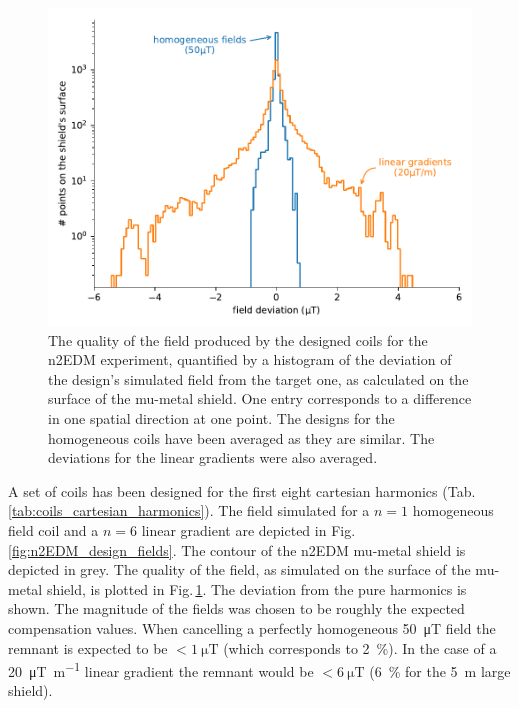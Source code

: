 \begin{figure}
  \centering
  \includegraphics[width=\linewidth]{gfx/prototype/n2EDM_coils_field.pdf}
  \caption{The quality of the field produced by the designed coils for the n2EDM experiment, quantified by a histogram of the deviation of the design's simulated field from the target one, as calculated on the surface of the mu-metal shield.
  One entry corresponds to a difference in one spatial direction at one point.
  The designs for the homogeneous coils have been averaged as they are similar. The deviations for the linear gradients were also averaged.}\label{fig:n2EDM_design_deviation}
\end{figure}

A set of coils has been designed for the first eight cartesian harmonics (Tab.\,\ref{tab:coils_cartesian_harmonics}).
The field simulated for a $n = 1$ homogeneous field coil and a $n = 6$ linear gradient are depicted in Fig.\,\ref{fig:n2EDM_design_fields}.
The contour of the n2EDM mu-metal shield is depicted in grey.
The quality of the field, as simulated on the surface of the mu-metal shield, is plotted in Fig.\,\ref{fig:n2EDM_design_deviation}.
The deviation from the pure harmonics is shown.
The magnitude of the fields was chosen to be roughly the expected compensation values.
When cancelling a perfectly homogeneous \SI{50}{\micro\tesla} field the remnant is expected to be $< \SI{1}{\micro\tesla}$ (which corresponds to \SI{2}{\percent}).
In the case of a \SI{20}{\micro\tesla\per\meter} linear gradient the remnant would be $< \SI{6}{\micro\tesla}$ (\SI{6}{\percent} for the \SI{5}{\metre} large shield).

